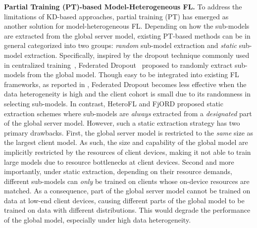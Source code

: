 \documentclass{article}
\begin{document}
\textbf{Partial Training (PT)-based Model-Heterogeneous FL.}
To address the limitations of KD-based approaches, partial training (PT) has emerged as another solution for model-heterogeneous FL.
%
Depending on how the sub-models are extracted from the global server model, existing PT-based methods can be in general categorized into two groups: \textit{random} sub-model extraction and \textit{static} sub-model extraction. 
%
Specifically, inspired by the dropout technique commonly used in centralized training~\citep{srivastava2014dropout}, Federated Dropout~\citep{caldas2018expanding} proposed to randomly extract sub-models from the global model. 
%
%
Though easy to be integrated into existing FL frameworks, as reported in \citep{cheng2022does}, Federated Dropout becomes less effective when the data heterogeneity is high and the client cohort is small due to its randomness in selecting sub-models. 
%
In contrast, HeteroFL \citep{diao2020heterofl} and FjORD  \citep{horvath2021fjord} proposed static extraction schemes where sub-models are \textit{always} extracted from a \textit{designated} part of the global server model.
%
However, such a static extraction strategy has two primary drawbacks. First, the global server model is restricted to the \textit{same} size as the largest client model. As such, the size and capability of the global model are implicitly restricted by the resources of client devices, making it not able to train large models due to resource bottlenecks at client devices. 
Second and more importantly, under static extraction, depending on their resource demands, different sub-models can \textit{only} be trained on clients whose on-device resources are matched. As a consequence, part of the global server model cannot be trained on data at low-end client devices, causing different parts of the global model to be trained on data with different distributions. This would degrade the performance of the global model, especially under high data heterogeneity.
\end{document}
